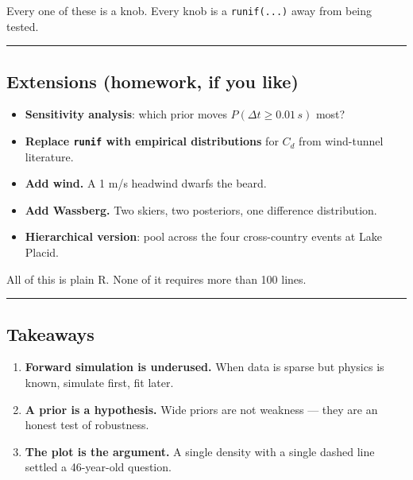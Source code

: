\documentclass[
  letterpaper,
  DIV=11,
  numbers=noendperiod]{scrartcl}
\providecommand{\tightlist}{%
  \setlength{\itemsep}{0pt}\setlength{\parskip}{0pt}}
\begin{document}
Every one of these is a knob. Every knob is a \texttt{runif(...)} away
from being tested.

\begin{center}\rule{0.5\linewidth}{0.5pt}\end{center}

\subsection{Extensions (homework, if you
like)}\label{extensions-homework-if-you-like}

\begin{itemize}
\tightlist
\item
  \textbf{Sensitivity analysis}: which prior moves
  \(P(\Delta t \geq 0.01\,s)\) most?
\item
  \textbf{Replace \texttt{runif} with empirical distributions} for
  \(C_d\) from wind-tunnel literature.
\item
  \textbf{Add wind.} A 1 m/s headwind dwarfs the beard.
\item
  \textbf{Add Wassberg.} Two skiers, two posteriors, one difference
  distribution.
\item
  \textbf{Hierarchical version}: pool across the four cross-country
  events at Lake Placid.
\end{itemize}

All of this is plain R. None of it requires more than 100 lines.

\begin{center}\rule{0.5\linewidth}{0.5pt}\end{center}

\subsection{Takeaways}\label{takeaways}

\begin{enumerate}
\def\labelenumi{\arabic{enumi}.}
\item
  \textbf{Forward simulation is underused.} When data is sparse but
  physics is known, simulate first, fit later.
\item
  \textbf{A prior is a hypothesis.} Wide priors are not weakness ---
  they are an honest test of robustness.
\item
  \textbf{The plot is the argument.} A single density with a single
  dashed line settled a 46-year-old question.
\end{enumerate}
\end{document}
